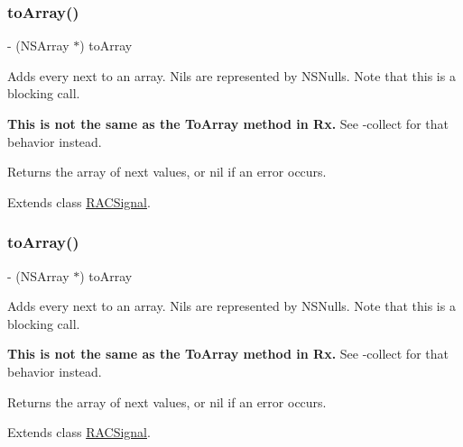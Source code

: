 \subsubsection{\texorpdfstring{to\+Array()}{toArray()}\hspace{0.1cm}{\footnotesize\ttfamily [1/3]}}
{\footnotesize\ttfamily -\/ (N\+S\+Array $\ast$) to\+Array \begin{DoxyParamCaption}{ }\end{DoxyParamCaption}}

Adds every {\ttfamily next} to an array. Nils are represented by N\+S\+Nulls. Note that this is a blocking call.

{\bfseries This is not the same as the {\ttfamily To\+Array} method in Rx.} See -\/collect for that behavior instead.

Returns the array of {\ttfamily next} values, or nil if an error occurs. 

Extends class \mbox{\hyperlink{interface_r_a_c_signal_a5b7a649ea4635f423b73cd4924652fe5}{R\+A\+C\+Signal}}.

\mbox{\label{category_r_a_c_signal_07_operations_08_a5b7a649ea4635f423b73cd4924652fe5}} 
\subsubsection{\texorpdfstring{to\+Array()}{toArray()}\hspace{0.1cm}{\footnotesize\ttfamily [2/3]}}
{\footnotesize\ttfamily -\/ (N\+S\+Array $\ast$) to\+Array \begin{DoxyParamCaption}{ }\end{DoxyParamCaption}}

Adds every {\ttfamily next} to an array. Nils are represented by N\+S\+Nulls. Note that this is a blocking call.

{\bfseries This is not the same as the {\ttfamily To\+Array} method in Rx.} See -\/collect for that behavior instead.

Returns the array of {\ttfamily next} values, or nil if an error occurs. 

Extends class \mbox{\hyperlink{interface_r_a_c_signal_a5b7a649ea4635f423b73cd4924652fe5}{R\+A\+C\+Signal}}.

\mbox{\label{category_r_a_c_signal_07_operations_08_a5b7a649ea4635f423b73cd4924652fe5}} 
